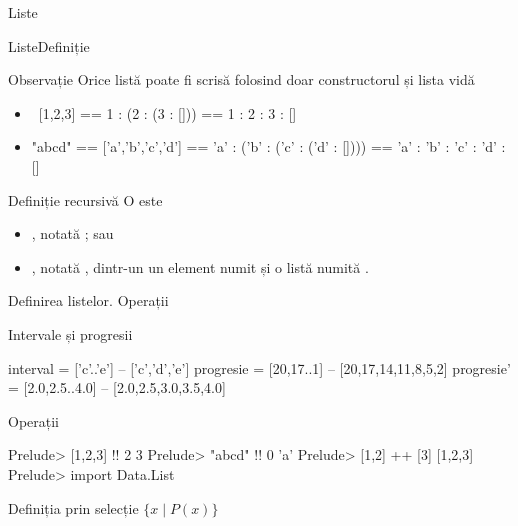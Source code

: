 \documentclass[xcolor=pdftex,romanian,colorlinks]{beamer}
\begin{document}
\begin{section}{Liste}
  \begin{frame}{Liste}{Definiție}
  \begin{block}
  {Observație}
  Orice listă poate fi scrisă folosind doar constructorul \structure{(:)} și lista vidă \structure{[]}
  \begin{itemize}
  \item\ [1,2,3] == 1 : (2 : (3 : [])) == 1 : 2 : 3 : []
  \item "abcd" == ['a','b','c','d'] == 'a' : ('b' : ('c' : ('d' : []))) == 'a' : 'b' : 'c' : 'd' : []
  \end{itemize}
  \end{block}
  \vfill
  \begin{block}{Definiție recursivă}
  O  este
  \begin{itemize}
  \item {}, notată \structure{[]}; sau
  \item {}, notată , dintr-un un element  numit  și o listă  numită .
  \end{itemize}
  \end{block}
  \vfill
  \end{frame}
  
  \begin{frame}[fragile]{Definirea listelor. Operații}
  \begin{block}{ Intervale și progresii}
  \begin{asciihs}
  interval = ['c'..'e']       -- ['c','d','e']
  progresie = [20,17..1]      -- [20,17,14,11,8,5,2]
  progresie' = [2.0,2.5..4.0] -- [2.0,2.5,3.0,3.5,4.0]
  \end{asciihs}
  \end{block}
  \pause
  \begin{block}{Operații}
  \begin{asciihs}
  Prelude> [1,2,3] !! 2
  3
  Prelude> "abcd" !! 0
  'a'
  Prelude> [1,2] ++ [3]
  [1,2,3]
  Prelude> import Data.List
  \end{asciihs}
  \end{block}
  \end{frame}
  
  \begin{frame}[fragile]{Definiția prin selecție $\{x\mid P(x)\}$}
  \structure{[E(x)| x <- [x1,…,xn], P(x)]}
  

\end{frame}
\end{section}
\end{document}
